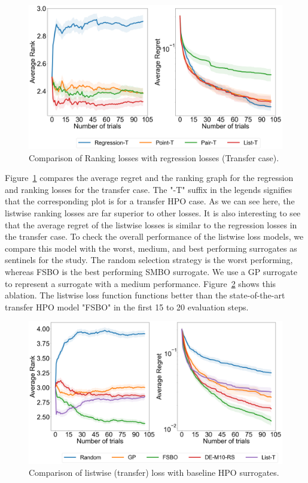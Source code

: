 \documentclass[12pt, twoside, ngerman]{report}
\begin{document}
\begin{figure}[h]
  \centering
    \includegraphics[scale=0.25]{images/Q1AblationTransfer}
    \caption{Comparison of Ranking losses with regression losses (Transfer case).}
    \label{fig:Q1AblationTransfer}
\end{figure}

Figure~\ref{fig:Q1AblationTransfer} compares the average regret and the ranking graph for the regression and ranking losses for the transfer case.
The "-T" suffix in the legends signifies that the corresponding plot is for a transfer HPO case.
As we can see here,  the listwise ranking losses are far superior to other losses.
It is also interesting to see that the average regret of the listwise losses is similar to the regression losses in the transfer case.
To check the overall performance of the listwise loss models, we compare this model with the worst,  medium, and best performing surrogates as sentinels for the study.
The random selection strategy is the worst performing,  whereas FSBO is the best performing SMBO surrogate. We use a GP surrogate to represent a surrogate with a medium performance.
Figure~\ref{fig:Q1FinalAblation} shows this ablation.
The listwise loss function functions better than the state-of-the-art transfer HPO model "FSBO" in the first 15 to 20 evaluation steps.

\begin{figure}[h]
  \centering
    \includegraphics[scale=0.25]{images/Q1FinalAblation}
    \caption{Comparison of listwise (transfer) loss with baseline HPO surrogates.}
    \label{fig:Q1FinalAblation}
\end{figure}
\end{document}
